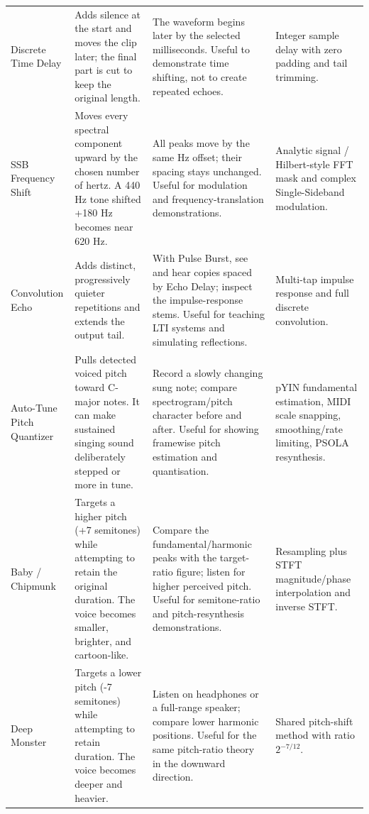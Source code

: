\documentclass[11pt,a4paper]{article}
\begin{document}
{\begin{longtable}{@{}p{.18\linewidth}p{.27\linewidth}p{.27\linewidth}p{.20\linewidth}@{}}
Discrete Time Delay & Adds silence at the start and moves the clip later; the final part is cut to keep the original length. & The waveform begins later by the selected milliseconds. Useful to demonstrate time shifting, not to create repeated echoes. & Integer sample delay with zero padding and tail trimming.\\

SSB Frequency Shift & Moves every spectral component upward by the chosen number of hertz. A 440 Hz tone shifted +180 Hz becomes near 620 Hz. & All peaks move by the same Hz offset; their spacing stays unchanged. Useful for modulation and frequency-translation demonstrations. & Analytic signal / Hilbert-style FFT mask and complex Single-Sideband modulation.\\

Convolution Echo & Adds distinct, progressively quieter repetitions and extends the output tail. & With Pulse Burst, see and hear copies spaced by Echo Delay; inspect the impulse-response stems. Useful for teaching LTI systems and simulating reflections. & Multi-tap impulse response and full discrete convolution.\\

Auto-Tune Pitch Quantizer & Pulls detected voiced pitch toward C-major notes. It can make sustained singing sound deliberately stepped or more in tune. & Record a slowly changing sung note; compare spectrogram/pitch character before and after. Useful for showing framewise pitch estimation and quantisation. & pYIN fundamental estimation, MIDI scale snapping, smoothing/rate limiting, PSOLA resynthesis.\\

Baby / Chipmunk & Targets a higher pitch (+7 semitones) while attempting to retain the original duration. The voice becomes smaller, brighter, and cartoon-like. & Compare the fundamental/harmonic peaks with the target-ratio figure; listen for higher perceived pitch. Useful for semitone-ratio and pitch-resynthesis demonstrations. & Resampling plus STFT magnitude/phase interpolation and inverse STFT.\\

Deep Monster & Targets a lower pitch (-7 semitones) while attempting to retain duration. The voice becomes deeper and heavier. & Listen on headphones or a full-range speaker; compare lower harmonic positions. Useful for the same pitch-ratio theory in the downward direction. & Shared pitch-shift method with ratio \(2^{-7/12}\).\\


\end{longtable}}
\end{document}
